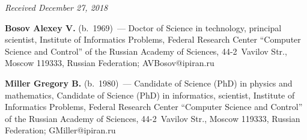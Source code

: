 \vspace*{-6pt}

\hfill{\small\textit{Received December 27, 2018}}



    \Contr
    
    \noindent
    \textbf{Bosov Alexey V.} (b.\ 1969)~--- Doctor of Science in technology, 
principal scientist, Institute of Informatics Problems, Federal Research Center 
``Computer Science and Control'' of the Russian Academy of Sciences, 44-2~Vavilov 
Str., Moscow 119333, Russian Federation; \mbox{AVBosov@ipiran.ru}
    
    \vspace*{3pt}
    
    \noindent
    \textbf{Miller Gregory B.} (b.\ 1980)~---
    Candidate of Science (PhD) in physics and mathematics, Candidate of Science 
    (PhD) in informatics, 
scientist, Institute of Informatics Problems, Federal Research Center ``Computer 
Science and Control'' of the Russian Academy of Sciences, 44-2~Vavilov Str., 
Moscow 119333, Russian Federation; \mbox{GMiller@ipiran.ru}

\label{end\stat}

\renewcommand{\bibname}{\protect\rm Литература}        